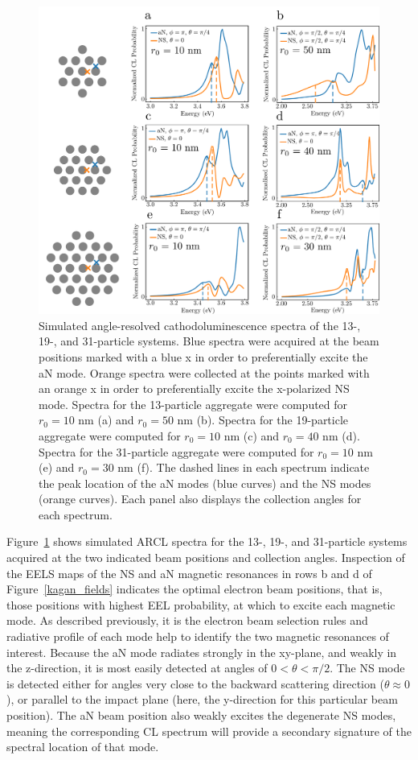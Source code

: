 \documentclass[journal=apchd5,manuscript=article]{achemso}
\begin{document}
\begin{figure}
\includegraphics{kagan_CL_spectra.pdf}
\caption{Simulated angle-resolved cathodoluminescence spectra of the 13-, 19-, and 31-particle systems. Blue spectra were acquired at the beam positions marked with a blue x in order to preferentially excite the aN mode. Orange spectra were collected at the points marked with an orange x in order to preferentially excite the x-polarized NS mode. Spectra for the 13-particle aggregate were computed for $r_0 = 10$ nm (a) and $r_0 = 50$ nm (b). Spectra for the 19-particle aggregate were computed for $r_0 = 10$ nm (c) and $r_0 = 40$ nm (d). Spectra for the 31-particle aggregate were computed for $r_0 = 10$ nm (e) and $r_0 = 30$ nm (f). The dashed lines in each spectrum indicate the peak location of the aN modes (blue curves) and the NS modes (orange curves). Each panel also displays the collection angles for each spectrum.}
\label{kagan_CL}
\end{figure}

Figure~\ref{kagan_CL} shows simulated ARCL spectra for the 13-, 19-, and 31-particle systems acquired at the two indicated beam positions and collection angles. Inspection of the EELS maps of the NS and aN magnetic resonances in rows b and d of Figure~\ref{kagan_fields} indicates the optimal electron beam positions, that is, those positions with highest EEL probability, at which to excite each magnetic mode. As described previously, it is the electron beam selection rules and radiative profile of each mode help to identify the two magnetic resonances of interest. Because the aN mode radiates strongly in the xy-plane, and weakly in the z-direction, it is most easily detected at angles of $0 < \theta < \pi/2$. The NS mode is detected either for angles very close to the backward scattering direction ($\theta \approx 0$), or parallel to the impact plane (here, the y-direction for this particular beam position). The aN beam position also weakly excites the degenerate NS modes, meaning the corresponding CL spectrum will provide a secondary signature of the spectral location of that mode.
\end{document}
